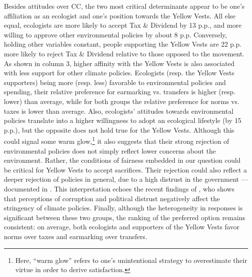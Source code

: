 \documentclass[english,5p,authoryear]{elsarticle}
\begin{document}
%
%
%
%
Besides attitudes over CC, the two most critical determinants appear to be one's affiliation as an ecologist and one's position towards the Yellow Vests. All else equal, ecologists are more likely to accept Tax \& Dividend by 13 p.p., and more willing to approve other environmental policies by about 8 p.p. Conversely, holding other variables constant, people supporting the Yellow Vests are 22 p.p. more likely to reject Tax \& Dividend relative to those opposed to the movement. As shown in column 3, higher affinity with the Yellow Vests is also associated with less support for other climate policies. Ecologists (resp. the Yellow Vests supporters) being more (resp. less) favorable to environmental policies and spending, their relative preference for earmarking vs. transfers is higher (resp. lower) than average, while for both groups the relative preference for norms vs. taxes is lower than average. Also, ecologists' attitudes towards environmental policies translate into a higher willingness to adopt an ecological lifestyle (by 15 p.p.), but the opposite does not hold true for the Yellow Vests. Although this could signal some warm glow,\footnote{Here, ``warm glow'' refers to one's unintentional strategy to overestimate their virtue in order to derive satisfaction.} it also suggests that their strong rejection of environmental policies does not simply reflect lower concerns about the environment. Rather, the conditions of fairness embedded in our question could be critical for Yellow Vests to accept sacrifices. Their rejection could also reflect a deeper rejection of policies in general, due to a high distrust in the government --- documented in \citet{algan_et_al_19}. This interpretation echoes the recent findings of \citet{rafaty_perceptions_2018}, who shows that perceptions of corruption and political distrust negatively affect the stringency of climate policies. Finally, although the heterogeneity in responses is significant between these two groups, the ranking of the preferred option remains consistent: on average, both ecologists and supporters of the Yellow Vests favor norms over taxes and earmarking over transfers. 
%

%
%

%

%
\end{document}
